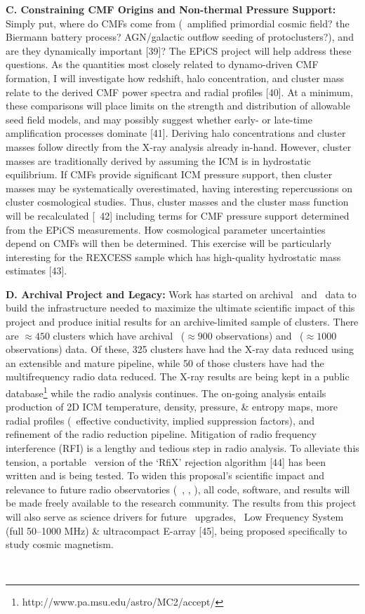 \documentclass[letterpaper,12pt]{article}
\newcommand{\myhead}{Cavagnolo, Hubble Proposal}
\begin{document}
{\bf{C. Constraining CMF Origins and Non-thermal Pressure Support:}}
Simply put, where do CMFs come from (\eg\ amplified primordial cosmic
field?  the Biermann battery process?  AGN/galactic outflow seeding of
protoclusters?), and are they dynamically important [39]? The EPiCS
project will help address these questions. As the quantities most
closely related to dynamo-driven CMF formation, I will investigate how
redshift, halo concentration, and cluster mass relate to the derived
CMF power spectra and radial profiles [40]. At a minimum, these
comparisons will place limits on the strength and distribution of
allowable seed field models, and may possibly suggest whether early-
or late-time amplification processes dominate [41]. Deriving halo
concentrations and cluster masses follow directly from the X-ray
analysis already in-hand. However, cluster masses are traditionally
derived by assuming the ICM is in hydrostatic equilibrium. If CMFs
provide significant ICM pressure support, then cluster masses may be
systematically overestimated, having interesting repercussions on
cluster cosmological studies. Thus, cluster masses and the cluster
mass function will be recalculated [\eg\ 42] including terms for CMF
pressure support determined from the EPiCS measurements. How
cosmological parameter uncertainties depend on CMFs will then be
determined. This exercise will be particularly interesting for the
REXCESS sample which has high-quality hydrostatic mass estimates [43].

{\bf{D. Archival Project and Legacy:}} Work has started on archival
\chandra\ and \vla\ data to build the infrastructure needed to
maximize the ultimate scientific impact of this project and produce
initial results for an archive-limited sample of clusters. There are
$\approx 450$ clusters which have archival \chandra\ ($\approx 900$
observations) and \vla\ ($\approx 1000$ observations) data. Of these,
325 clusters have had the X-ray data reduced using an extensible and
mature pipeline, while 50 of those clusters have had the
multifrequency radio data reduced. The X-ray results are being kept in
a public database\footnote{http://www.pa.msu.edu/astro/MC2/accept/}
while the radio analysis continues. The on-going analysis entails
production of 2D ICM temperature, density, pressure, \& entropy maps,
more radial profiles (\eg\ effective conductivity, implied suppression
factors), and refinement of the radio reduction pipeline. Mitigation
of radio frequency interference (RFI) is a lengthy and tedious step in
radio analysis. To alleviate this tension, a portable \python\ version
of the `RfiX' rejection algorithm [44] has been written and is being
tested. To widen this proposal's scientific impact and relevance to
future radio observatories (\eg\ \lofar, \lwa, \ska), all code,
software, and results will be made freely available to the research
community. The results from this project will also serve as science
drivers for future \evla\ upgrades, \ie\ Low Frequency System (full
50--1000 MHz) \& ultracompact E-array [45], being proposed
specifically to study cosmic magnetism.\\

\markright{\myhead}\\



\markright{\myhead}




\end{document}
